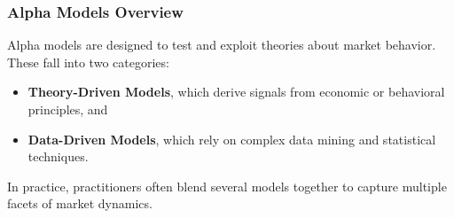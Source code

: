 \subsubsection{Alpha Models Overview}

Alpha models are designed to test and exploit theories about market behavior. These fall into two categories:
\begin{itemize}
  \item \textbf{Theory-Driven Models}, which derive signals from economic or behavioral principles, and
  \item \textbf{Data-Driven Models}, which rely on complex data mining and statistical techniques.
\end{itemize}
In practice, practitioners often blend several models together to capture multiple facets of market dynamics.

